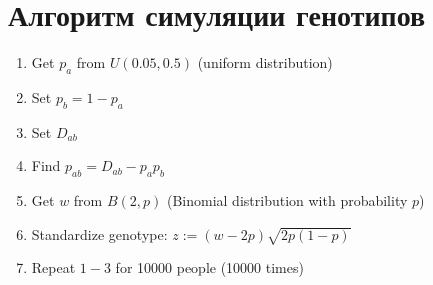 \documentclass{article}
\begin{document}
\setlength{\parindent}{15pt}

\section{Алгоритм симуляции генотипов}

\hspace*{\parindent}
\begin{enumerate}
\item Get $p_a$ from $U(0.05, 0.5)$ (uniform distribution)
\item Set $p_b = 1 - p_a$
\item Set $D_{ab}$
\item Find $p_{ab} = D_{ab} - p_a p_b$
\item Get $w$ from $B(2, p)$ (Binomial distribution with probability $p$)
\item Standardize genotype: $z := \left( w - 2p \right) \sqrt{2p \left( 1 - p \right)}$
\item Repeat $1 - 3$ for 10000 people (10000 times)
\end{enumerate}
\end{document}
